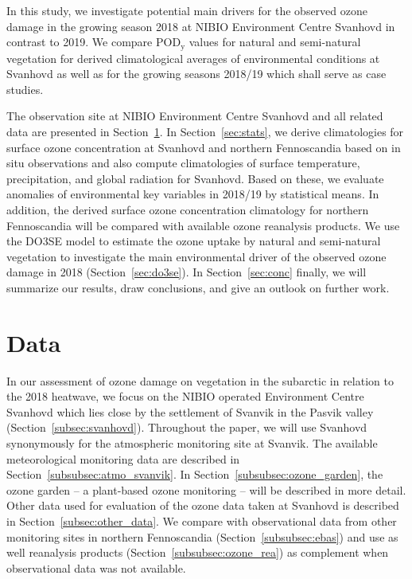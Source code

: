 \documentclass[bg, manuscript]{copernicus}
\begin{document}
In this study, we investigate potential main drivers for the observed ozone damage in the growing season 2018 at NIBIO Environment Centre Svanhovd in contrast to 2019. We compare $\mathrm{POD_y}$ values for natural and semi-natural vegetation for derived climatological averages of environmental conditions at Svanhovd as well as for the growing seasons 2018/19 which shall serve as case studies.

The observation site at NIBIO Environment Centre Svanhovd and all related data are presented in Section~\ref{sec:data}. In Section~\ref{sec:stats}, we derive climatologies for surface ozone concentration at Svanhovd and northern Fennoscandia based on in situ observations and also compute climatologies of surface temperature, precipitation, and global radiation for Svanhovd. Based on these, we evaluate anomalies of environmental key variables in 2018/19 by statistical means. In addition, the derived surface ozone concentration climatology for northern Fennoscandia will be compared with available ozone reanalysis products. We use the DO3SE model to estimate the ozone uptake by natural and semi-natural vegetation to investigate the main environmental driver of the observed ozone damage in 2018 (Section~\ref{sec:do3se}). In Section~\ref{sec:conc} finally, we will summarize our results, draw conclusions, and give an outlook on further work.


\section{Data}
\label{sec:data}

In our assessment of ozone damage on vegetation in the subarctic in relation to the 2018 heatwave, we focus on the NIBIO operated Environment Centre Svanhovd which lies close by the settlement of Svanvik in the Pasvik valley (Section~\ref{subsec:svanhovd}). Throughout the paper, we will use Svanhovd synonymously for the atmospheric monitoring site at Svanvik. The available meteorological monitoring data are described in Section~\ref{subsubsec:atmo_svanvik}. In Section~\ref{subsubsec:ozone_garden}, the ozone garden -- a plant-based ozone monitoring -- will be described in more detail. Other data used for evaluation of the ozone data taken at Svanhovd is described in Section~\ref{subsec:other_data}. We compare with observational data from other monitoring sites in northern Fennoscandia (Section~\ref{subsubsec:ebas}) and use as well reanalysis products (Section~\ref{subsubsec:ozone_rea}) as complement when observational data was not available.
\end{document}
